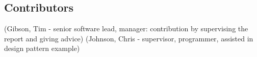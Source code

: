 \subsection*{Contributors}

(Gibson, Tim - senior software lead, manager: contribution by supervising the report and giving advice) 
(Johnson, Chris - supervisor, programmer, assisted in design pattern example)

\newpage